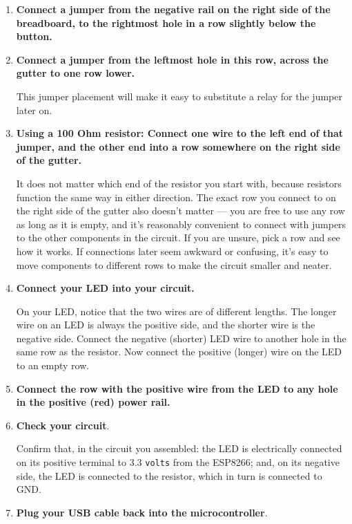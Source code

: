 \begin{enumerate}
	\item \textbf{Connect a jumper from the negative rail on the right side of the breadboard, to the rightmost hole in a row slightly below the button.}
	\item \textbf{Connect a jumper from the leftmost hole in this row, across the gutter to one row lower.}

	This jumper placement will make it easy to substitute a relay for the jumper later on.
	\item \textbf{Using a 100 Ohm resistor: Connect one wire to the left end of that jumper, and the other end into a row somewhere on the right side of the gutter.}

	It does not matter which end of the resistor you start with, because resistors function the same way in either direction.
	The exact row you connect to on the right side of the gutter also doesn't matter --- you are free to use any row as long as it is empty, and it's reasonably convenient to connect with jumpers to the other components in the circuit.
	If you are unsure, pick a row and see how it works.
	If connections later seem awkward or confusing, it's easy to move components to different rows to make the circuit smaller and neater.



	\item \textbf{Connect your LED into your circuit.}

	On your LED, notice that the two wires are of different lengths. The longer wire on an LED is always the positive side, and the shorter wire is the negative side. Connect the negative (shorter) LED wire to another hole in the same row as the resistor. Now connect the positive (longer) wire on the LED to an empty row.

	\item \textbf{Connect the row with the positive wire from the LED to any hole in the positive (red) power rail.}

	\item \textbf{Check your circuit}.

	Confirm that, in the circuit you assembled: the LED is electrically connected on its positive terminal to 3.3 \texttt{volts} from the ESP8266; and, on its negative side, the LED is connected to the resistor, which in turn is connected to GND.

	\item \textbf{Plug your USB cable back into the microcontroller}.
\end{enumerate}
